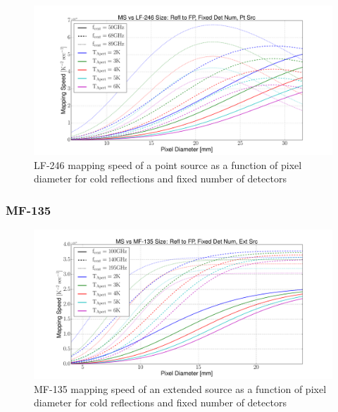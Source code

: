 \documentclass[12pt, titlepage]{article} %
\begin{document}
\begin{figure}[H]
	\centering
	\includegraphics[width=1.1\textwidth, center]{PDF/LFT_MS_LF-246_coldRefl_fixDetNum_ptSrc.pdf}
	\caption{LF-246 mapping speed of a point source as a function of pixel diameter for cold reflections and fixed number of detectors}
\end{figure}


\subsubsection{MF-135}

\begin{figure}[H]
	\centering
	\includegraphics[width=1.1\textwidth, center]{PDF/LFT_MS_MF-135_coldRefl_fixDetNum_extSrc.pdf}
	\caption{MF-135 mapping speed of an extended source as a function of pixel diameter for cold reflections and fixed number of detectors}
\end{figure}
\end{document}
